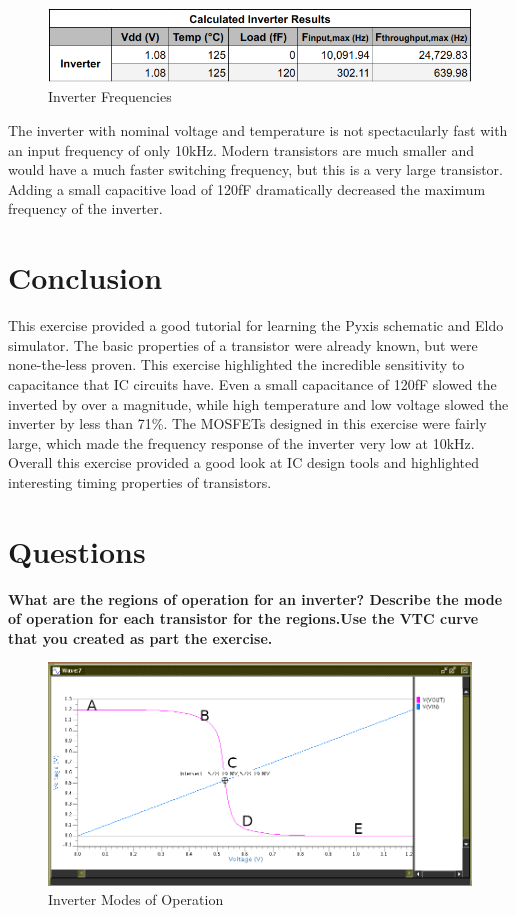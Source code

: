 \documentclass[11pt]{article}
\begin{document}
		\begin{figure}[H]
			\centering
			\includegraphics[width=1\linewidth]{"Pictures/Calculated Inverter Results"}
			\caption[Inverter Results]{Inverter Frequencies}
			\label{fig:calculated-inverter-results}
		\end{figure}
	
		The inverter with nominal voltage and temperature is not spectacularly fast with an input frequency of only 10kHz. Modern transistors are much smaller and would have a much faster switching frequency, but this is a very large transistor. Adding a small capacitive load of 120fF dramatically decreased the maximum frequency of the inverter.

\clearpage
\vfill
\section{Conclusion}
	This exercise provided a good tutorial for learning the Pyxis schematic and Eldo simulator. The basic properties of a transistor were already known, but were none-the-less proven. This exercise highlighted the incredible sensitivity to capacitance that IC circuits have. Even a small capacitance of 120fF slowed the inverted by over a magnitude, while high temperature and low voltage slowed the inverter by less than 71\%. The MOSFETs designed in this exercise were fairly large, which made the frequency response of the inverter very low at 10kHz. Overall this exercise provided a good look at IC design tools and highlighted interesting timing properties of transistors. 


\section*{Questions}

	\textbf{What are the regions of operation for an inverter? Describe the mode of operation for each transistor for the regions.Use the VTC curve that you created as part the exercise.}
	
	\begin{figure}[H]
		\centering
		\includegraphics[width=0.7\linewidth]{"Pictures/Inverter Waveform Question"}
		\caption[]{Inverter Modes of Operation}
		\label{fig:transient-sim-labeled}
	\end{figure}
	
\end{document}
